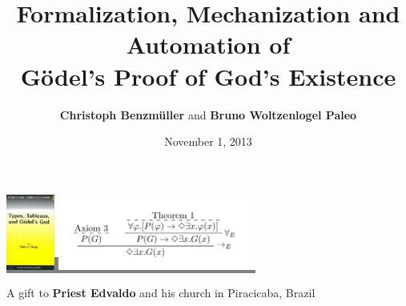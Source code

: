 \documentclass[9pt,mathserif,handout]{beamer}
\title[On G\"{o}del's Proof of God's
Existence]{Formalization, Mechanization and Automation of \\ G\"{o}del's
  Proof of God's Existence}
\author{\textbf{Christoph Benzm\"{u}ller} and \textbf{Bruno Woltzenlogel Paleo}}
\date[1.11.2013]{November 1, 2013}
\begin{document}
\begin{frame}
  \titlepage
\colorbox{gray}{\includegraphics[height=2.5cm]{buch7.jpg} }
\hfill
\colorbox{gray}{\includegraphics[height=2.5cm]{nd.png}}

\hfill \begin{footnotesize}A gift to \textbf{Priest Edvaldo} and his church in Piracicaba, Brazil\end{footnotesize}
\end{frame}












\end{document}
